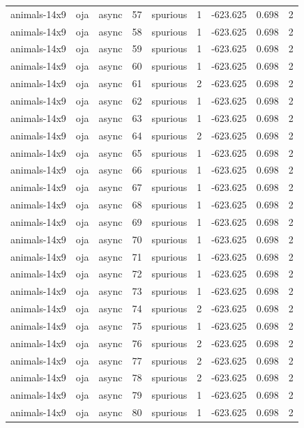 \begin{tabular}{lllrlrrrr}
animals-14x9 & oja & async & 57 & spurious & 1 & -623.625 & 0.698 & 2 \\
animals-14x9 & oja & async & 58 & spurious & 1 & -623.625 & 0.698 & 2 \\
animals-14x9 & oja & async & 59 & spurious & 1 & -623.625 & 0.698 & 2 \\
animals-14x9 & oja & async & 60 & spurious & 1 & -623.625 & 0.698 & 2 \\
animals-14x9 & oja & async & 61 & spurious & 2 & -623.625 & 0.698 & 2 \\
animals-14x9 & oja & async & 62 & spurious & 1 & -623.625 & 0.698 & 2 \\
animals-14x9 & oja & async & 63 & spurious & 1 & -623.625 & 0.698 & 2 \\
animals-14x9 & oja & async & 64 & spurious & 2 & -623.625 & 0.698 & 2 \\
animals-14x9 & oja & async & 65 & spurious & 1 & -623.625 & 0.698 & 2 \\
animals-14x9 & oja & async & 66 & spurious & 1 & -623.625 & 0.698 & 2 \\
animals-14x9 & oja & async & 67 & spurious & 1 & -623.625 & 0.698 & 2 \\
animals-14x9 & oja & async & 68 & spurious & 1 & -623.625 & 0.698 & 2 \\
animals-14x9 & oja & async & 69 & spurious & 1 & -623.625 & 0.698 & 2 \\
animals-14x9 & oja & async & 70 & spurious & 1 & -623.625 & 0.698 & 2 \\
animals-14x9 & oja & async & 71 & spurious & 1 & -623.625 & 0.698 & 2 \\
animals-14x9 & oja & async & 72 & spurious & 1 & -623.625 & 0.698 & 2 \\
animals-14x9 & oja & async & 73 & spurious & 1 & -623.625 & 0.698 & 2 \\
animals-14x9 & oja & async & 74 & spurious & 2 & -623.625 & 0.698 & 2 \\
animals-14x9 & oja & async & 75 & spurious & 1 & -623.625 & 0.698 & 2 \\
animals-14x9 & oja & async & 76 & spurious & 2 & -623.625 & 0.698 & 2 \\
animals-14x9 & oja & async & 77 & spurious & 2 & -623.625 & 0.698 & 2 \\
animals-14x9 & oja & async & 78 & spurious & 2 & -623.625 & 0.698 & 2 \\
animals-14x9 & oja & async & 79 & spurious & 1 & -623.625 & 0.698 & 2 \\
animals-14x9 & oja & async & 80 & spurious & 1 & -623.625 & 0.698 & 2 \\

\end{tabular}
